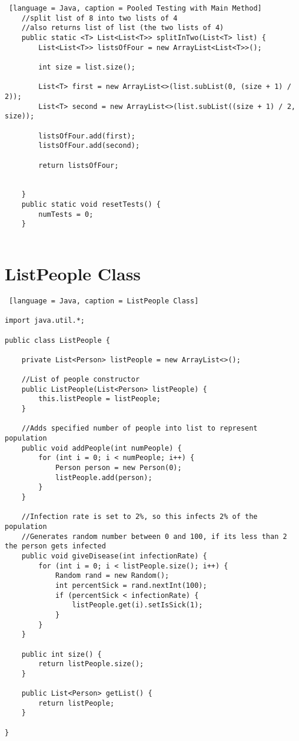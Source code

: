 \documentclass{article}
\begin{document}
\begin{lstlisting} [language = Java, caption = Pooled Testing with Main Method]
    //split list of 8 into two lists of 4
    //also returns list of list (the two lists of 4)
    public static <T> List<List<T>> splitInTwo(List<T> list) {
        List<List<T>> listsOfFour = new ArrayList<List<T>>();

        int size = list.size();
    
        List<T> first = new ArrayList<>(list.subList(0, (size + 1) / 2));
        List<T> second = new ArrayList<>(list.subList((size + 1) / 2, size));

        listsOfFour.add(first);
        listsOfFour.add(second);

        return listsOfFour;


    }
    public static void resetTests() {
        numTests = 0;
    }


\end{lstlisting}


\section{ListPeople Class}

\begin{lstlisting} [language = Java, caption = ListPeople Class]

import java.util.*;

public class ListPeople {
    
    private List<Person> listPeople = new ArrayList<>();
    
    //List of people constructor
    public ListPeople(List<Person> listPeople) {
        this.listPeople = listPeople;
    }

    //Adds specified number of people into list to represent population
    public void addPeople(int numPeople) {
        for (int i = 0; i < numPeople; i++) {
            Person person = new Person(0);
            listPeople.add(person);
        }
    }

    //Infection rate is set to 2%, so this infects 2% of the population
    //Generates random number between 0 and 100, if its less than 2 the person gets infected
    public void giveDisease(int infectionRate) {
        for (int i = 0; i < listPeople.size(); i++) {
            Random rand = new Random();
            int percentSick = rand.nextInt(100);
            if (percentSick < infectionRate) {
                listPeople.get(i).setIsSick(1);
            }
        }
    }

    public int size() {
        return listPeople.size();
    }

    public List<Person> getList() {
        return listPeople;
    }
    
}


\end{lstlisting}
\end{document}
